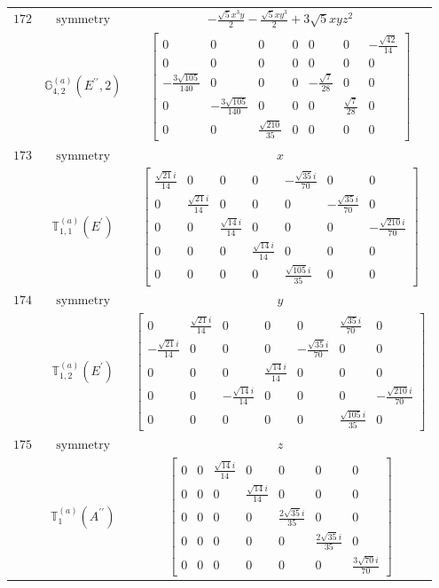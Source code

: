 \documentclass[fleqn,8pt,landscape]{jsarticle}
\begin{document}
\begin{longtable}{ccc}
$ 172 $ & $ \text{symmetry} $ & $ - \frac{\sqrt{5} x^{3} y}{2} - \frac{\sqrt{5} x y^{3}}{2} + 3 \sqrt{5} x y z^{2} $ \\
$  $ & $ \mathbb{G}_{4,2}^{(a)}(E^{\prime\prime},2) $ & $ \begin{bmatrix} 0 & 0 & 0 & 0 & 0 & 0 & - \frac{\sqrt{42}}{14} \\ 0 & 0 & 0 & 0 & 0 & 0 & 0 \\ - \frac{3 \sqrt{105}}{140} & 0 & 0 & 0 & - \frac{\sqrt{7}}{28} & 0 & 0 \\ 0 & - \frac{3 \sqrt{105}}{140} & 0 & 0 & 0 & \frac{\sqrt{7}}{28} & 0 \\ 0 & 0 & \frac{\sqrt{210}}{35} & 0 & 0 & 0 & 0 \end{bmatrix} $ \\ \hline
$ 173 $ & $ \text{symmetry} $ & $ x $ \\
$  $ & $ \mathbb{T}_{1,1}^{(a)}(E^{\prime}) $ & $ \begin{bmatrix} \frac{\sqrt{21} i}{14} & 0 & 0 & 0 & - \frac{\sqrt{35} i}{70} & 0 & 0 \\ 0 & \frac{\sqrt{21} i}{14} & 0 & 0 & 0 & - \frac{\sqrt{35} i}{70} & 0 \\ 0 & 0 & \frac{\sqrt{14} i}{14} & 0 & 0 & 0 & - \frac{\sqrt{210} i}{70} \\ 0 & 0 & 0 & \frac{\sqrt{14} i}{14} & 0 & 0 & 0 \\ 0 & 0 & 0 & 0 & \frac{\sqrt{105} i}{35} & 0 & 0 \end{bmatrix} $ \\ \hline
$ 174 $ & $ \text{symmetry} $ & $ y $ \\
$  $ & $ \mathbb{T}_{1,2}^{(a)}(E^{\prime}) $ & $ \begin{bmatrix} 0 & \frac{\sqrt{21} i}{14} & 0 & 0 & 0 & \frac{\sqrt{35} i}{70} & 0 \\ - \frac{\sqrt{21} i}{14} & 0 & 0 & 0 & - \frac{\sqrt{35} i}{70} & 0 & 0 \\ 0 & 0 & 0 & \frac{\sqrt{14} i}{14} & 0 & 0 & 0 \\ 0 & 0 & - \frac{\sqrt{14} i}{14} & 0 & 0 & 0 & - \frac{\sqrt{210} i}{70} \\ 0 & 0 & 0 & 0 & 0 & \frac{\sqrt{105} i}{35} & 0 \end{bmatrix} $ \\ \hline
$ 175 $ & $ \text{symmetry} $ & $ z $ \\
$  $ & $ \mathbb{T}_{1}^{(a)}(A^{\prime\prime}) $ & $ \begin{bmatrix} 0 & 0 & \frac{\sqrt{14} i}{14} & 0 & 0 & 0 & 0 \\ 0 & 0 & 0 & \frac{\sqrt{14} i}{14} & 0 & 0 & 0 \\ 0 & 0 & 0 & 0 & \frac{2 \sqrt{35} i}{35} & 0 & 0 \\ 0 & 0 & 0 & 0 & 0 & \frac{2 \sqrt{35} i}{35} & 0 \\ 0 & 0 & 0 & 0 & 0 & 0 & \frac{3 \sqrt{70} i}{70} \end{bmatrix} $ \\ \hline

\end{longtable}
\end{document}
